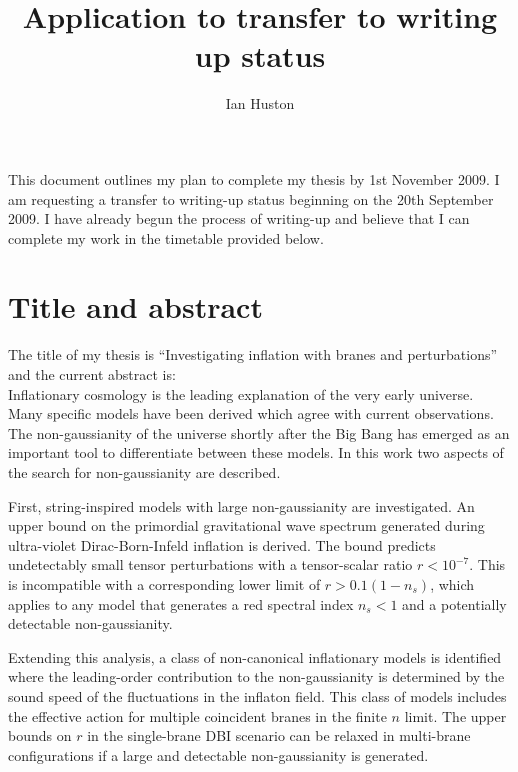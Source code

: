 \documentclass[a4paper,11pt]{article}
\title{Application to transfer to writing up status}
\author{Ian Huston}
\begin{document}
\maketitle

This document outlines my plan to complete my thesis by 1st November 2009. I am requesting a
transfer to writing-up status beginning on the 20th September 2009. I have already begun the
process of writing-up and believe that I can complete my work in the timetable provided below. 

\section*{Title and abstract}
The title of my thesis is ``Investigating inflation with branes and perturbations'' and the current
abstract is:
\\

Inflationary cosmology is the leading explanation of the very early universe. 
Many specific models have been derived which agree with current observations.
The non-gaussianity of the universe shortly after the Big Bang has emerged as
an important tool to differentiate between these models. In this work
two aspects of the search for non-gaussianity are described.

First, string-inspired models with large non-gaussianity are investigated.
An upper bound on the primordial gravitational wave spectrum
generated during ultra-violet Dirac-Born-Infeld inflation is derived. 
The bound predicts
undetectably small tensor perturbations with a tensor-scalar ratio $r <
10^{-7}$. 
This is incompatible with a corresponding lower limit of $r > 0.1
(1-n_s)$, which applies to any model that generates a red spectral index $n_s
<1$ and a potentially detectable non-gaussianity.

Extending this analysis, a class of non-canonical inflationary models is
identified where the leading-order contribution to the non-gaussianity is
determined by the sound speed of the fluctuations in
the inflaton field. 
This class of models includes the effective action for
multiple coincident branes in the finite $n$ limit. 
The upper bounds on $r$ in the single-brane
DBI scenario can be relaxed in multi-brane configurations if a large and
detectable non-gaussianity is generated. 
\end{document}
